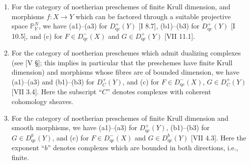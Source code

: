 \documentclass[12pt]{book}
\begin{document}
\begin{enumerate}
\item[(i)] For the category of noetherian preschemes of finite Krull dimension, and morphisms \(f\colon X\to Y\) which can be factored through a suitable projective space \(\mathbb{P}_Y^N\), we have (a1)--(a3) for \(D_{\mathrm{qc}}^+(Y)\) [I 8.7], (b1)--(b3) for \(D_{\mathrm{qc}}^+(Y)\) [I 10.5], and (c) for \(F\in D_{\mathrm{qc}}^-(X)\) and \(G\in D_{\mathrm{qc}}^+(Y)\) [VII 11.1].

\item[(ii)] For the category of noetherian preschemes which admit dualizing complexes (see [V \S]; this implies in particular that the preschemes have finite Krull dimension) and morphisms whose fibres are of bounded dimension, we have (a1)--(a3) and (b1)--(b3) for \(D_{C}^+(Y)\), and (c) for \(F\in D_{\mathrm{qc}}^-(X)\), \(G\in D_{C}^+(Y)\) [VII 3.4]. Here the subscript ``\(C\)'' denotes complexes with coherent cohomology sheaves.

\item[(iii)] For the category of noetherian preschemes of finite Krull dimension and smooth morphisms, we have (a1)--(a3) for \(D_{\mathrm{qc}}^+(Y)\), (b1)--(b3) for \(G\in D_{\mathrm{qc}}^b(Y)\), and (c) for \(F\in D_{\mathrm{qc}}^-(X)\) and \(G\in D_{\mathrm{qc}}^b(Y)\) [VII 4.3]. Here the exponent ``\(b\)'' denotes complexes which are bounded in both directions, i.e., finite.
\end{enumerate}
\end{document}
